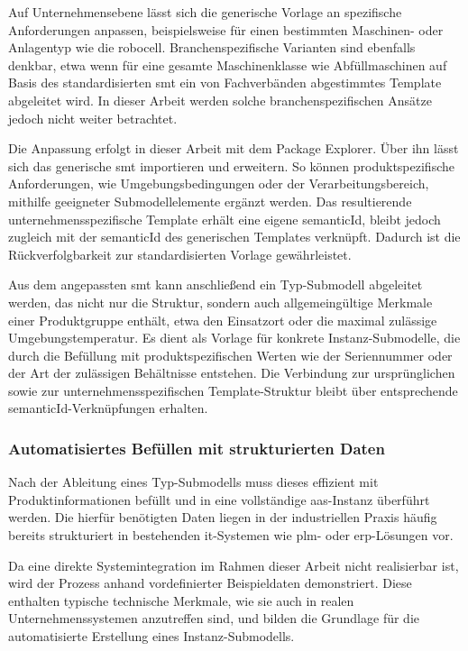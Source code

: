 Auf Unternehmensebene lässt sich die generische Vorlage an spezifische Anforderungen anpassen, beispielsweise für einen bestimmten Maschinen- oder Anlagentyp wie die robocell. 
Branchenspezifische Varianten sind ebenfalls denkbar, etwa wenn für eine gesamte Maschinenklasse wie Abfüllmaschinen auf Basis des standardisierten \acs{smt} ein von Fachverbänden abgestimmtes Template abgeleitet wird.
In dieser Arbeit werden solche branchenspezifischen Ansätze jedoch nicht weiter betrachtet.

Die Anpassung erfolgt in dieser Arbeit mit dem Package Explorer.
Über ihn lässt sich das generische \acs{smt} importieren und erweitern.
So können produktspezifische Anforderungen, wie Umgebungsbedingungen oder der Verarbeitungsbereich, mithilfe geeigneter Submodellelemente ergänzt werden.
Das resultierende unternehmensspezifische Template erhält eine eigene \mbox{semanticId}, bleibt jedoch zugleich mit der semanticId des generischen Templates verknüpft.
Dadurch ist die Rückverfolgbarkeit zur standardisierten Vorlage gewährleistet.

Aus dem angepassten \acs{smt} kann anschließend ein Typ-Submodell abgeleitet werden, das nicht nur die Struktur, sondern auch allgemeingültige Merkmale einer Produktgruppe enthält, etwa den Einsatzort oder die maximal zulässige Umgebungstemperatur.
Es dient als Vorlage für konkrete Instanz-Submodelle, die durch die Befüllung mit produktspezifischen Werten wie der Seriennummer oder der Art der zulässigen Behältnisse entstehen.
Die Verbindung zur ursprünglichen sowie zur unternehmensspezifischen Template-Struktur bleibt über entsprechende semanticId-Verknüpfungen erhalten.

\subsubsection{Automatisiertes Befüllen mit strukturierten Daten}

Nach der Ableitung eines Typ-Submodells muss dieses effizient mit Produktinformationen befüllt und in eine vollständige \acs{aas}-Instanz überführt werden. 
Die hierfür benötigten Daten liegen in der industriellen Praxis häufig bereits strukturiert in bestehenden \mbox{\acs{it}-Systemen} wie \acs{plm}- oder \acs{erp}-Lösungen vor.

Da eine direkte Systemintegration im Rahmen dieser Arbeit nicht realisierbar ist, wird der Prozess anhand vordefinierter Beispieldaten demonstriert.
Diese enthalten typische technische Merkmale, wie sie auch in realen Unternehmenssystemen anzutreffen sind, und bilden die Grundlage für die automatisierte Erstellung eines Instanz-Submodells.

